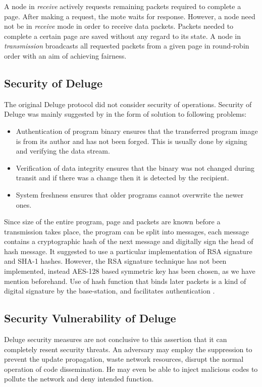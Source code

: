 \documentclass[conference,final]{IEEEtran}
\begin{document}
A node in \textit{receive} actively requests remaining packets required to complete a page. After making a request, the mote waits for response. However, a node need not be in \textit{receive} mode in order to receive data packets.
Packets needed to complete a certain page are saved without any regard to its state.
A node in \textit{transmission} broadcasts all requested packets from a given page in round-robin order with an aim of achieving fairness.

\subsection{Security of Deluge}
The original Deluge protocol did not consider security of operations.
Security of Deluge was mainly suggested by \cite{1127826} in the form of solution to following problems:
\begin{itemize}
\item	Authentication of program binary ensures that the transferred program image is from its author and has not been forged. This is usually done by signing and verifying the data stream.
\item	Verification of data integrity ensures that the binary was not changed during transit and if there was a change then it is detected by the recipient. 
\item 	System freshness ensures that older programs cannot overwrite the newer ones.
\end{itemize}
Since size of the entire program, page and packets are known before a transmission takes place, the program can be split into messages, each message contains a cryptographic hash of the next message and digitally sign the head of hash message.
It suggested to use a particular implementation of RSA signature and SHA-1 hashes.
However, the RSA signature technique has not been implemented, instead AES-128 based symmetric key has been chosen, as we have mention beforehand. 
Use of hash function that binds later packets is a kind of digital signature by the base-station, and  facilitates authentication \cite{1127826}.



\subsection{Security Vulnerability of Deluge}
Deluge security measures are not conclusive to this assertion that it can completely resent security threats. 
An adversary may employ  the suppression to prevent the update propagation, waste network resources, disrupt the normal operation of code dissemination. 
He may even be able to inject malicious codes to pollute the network and deny intended function.
\end{document}
